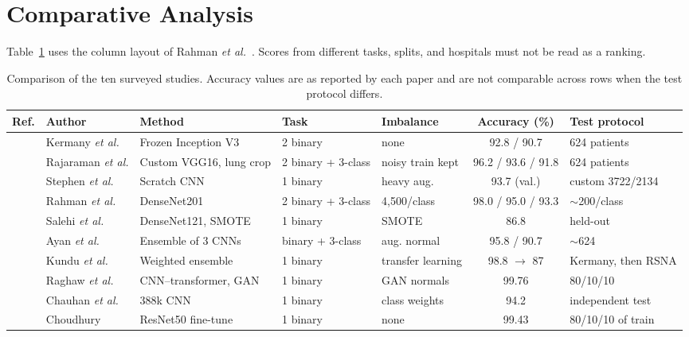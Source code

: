 \documentclass[conference]{IEEEtran}
\begin{document}
\section{Comparative Analysis}
\label{sec:compare}
Table~\ref{tab:matrix} uses the column layout of Rahman \textit{et al.}~\cite{rahman2020}. Scores from different tasks, splits, and hospitals must not be read as a ranking.

\begin{table}[htbp]
\centering
\caption{Comparison of the ten surveyed studies. Accuracy values are as reported by each paper and are not comparable across rows when the test protocol differs.}
\label{tab:matrix}
\begin{tabular}{cllllcl}
\toprule
\textbf{Ref.} & \textbf{Author} & \textbf{Method} & \textbf{Task} & \textbf{Imbalance} & \textbf{Accuracy (\%)} & \textbf{Test protocol} \\
\midrule
\cite{kermany2018} & Kermany \textit{et al.} & Frozen Inception V3 & 2 binary & none & 92.8 / 90.7 & 624 patients \\
\cite{rajaraman2018} & Rajaraman \textit{et al.} & Custom VGG16, lung crop & 2 binary + 3-class & noisy train kept & 96.2 / 93.6 / 91.8 & 624 patients \\
\cite{stephen2019} & Stephen \textit{et al.} & Scratch CNN & 1 binary & heavy aug. & 93.7 (val.) & custom 3722/2134 \\
\cite{rahman2020} & Rahman \textit{et al.} & DenseNet201 & 2 binary + 3-class & 4{,}500/class & 98.0 / 95.0 / 93.3 & $\sim$200/class \\
\cite{salehi2021} & Salehi \textit{et al.} & DenseNet121, SMOTE & 1 binary & SMOTE & 86.8 & held-out \\
\cite{ayan2021} & Ayan \textit{et al.} & Ensemble of 3 CNNs & binary + 3-class & aug. normal & 95.8 / 90.7 & $\sim$624 \\
\cite{kundu2021} & Kundu \textit{et al.} & Weighted ensemble & 1 binary & transfer learning & 98.8 $\rightarrow$ 87 & Kermany, then RSNA \\
\cite{raghaw2024} & Raghaw \textit{et al.} & CNN--transformer, GAN & 1 binary & GAN normals & 99.76 & 80/10/10 \\
\cite{chauhan2025} & Chauhan \textit{et al.} & 388k CNN & 1 binary & class weights & 94.2 & independent test \\
\cite{choudhury2026} & Choudhury & ResNet50 fine-tune & 1 binary & none & 99.43 & 80/10/10 of train \\
\bottomrule
\end{tabular}
\end{table}
\end{document}
